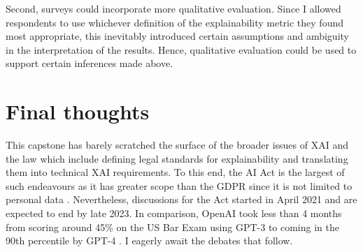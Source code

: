 Second, surveys could incorporate more qualitative evaluation. Since I allowed respondents to use whichever definition of the explainability metric they found most appropriate, this inevitably introduced certain assumptions and ambiguity in the interpretation of the results. Hence, qualitative evaluation could be used to support certain inferences made above.

\section{Final thoughts}
This capstone has barely scratched the surface of the broader issues of XAI and the law which include defining legal standards for explainability and translating them into technical XAI requirements. To this end, the AI Act is the largest of such endeavours as it has greater scope than the GDPR since it is not limited to personal data \cite{lilian_ai_act}. Nevertheless, discussions for the Act started in April 2021 and are expected to end by late 2023. In comparison, OpenAI took less than 4 months from scoring around 45\% on the US Bar Exam using GPT-3 to coming in the 90th percentile by GPT-4 \cite{katz2023gpt}. I eagerly await the debates that follow.